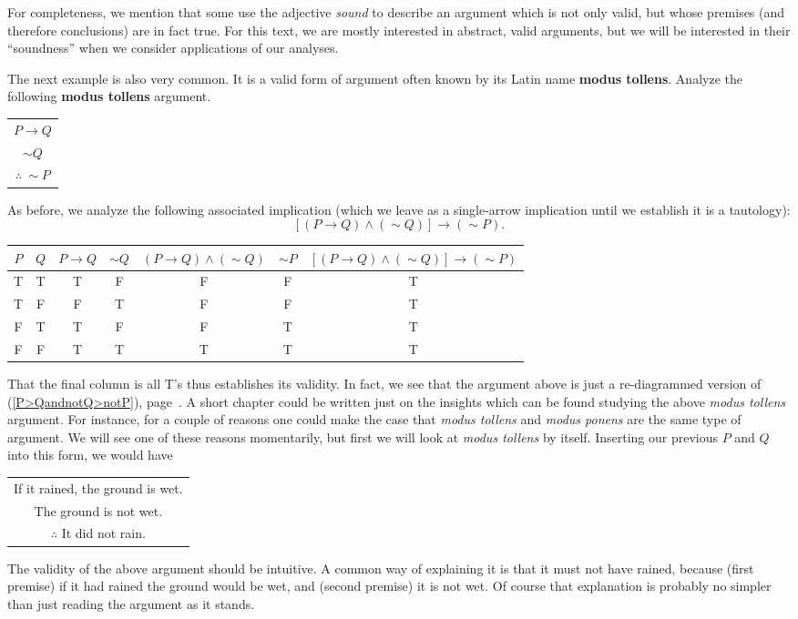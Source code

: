 For completeness, we mention that some use the adjective {\it sound}
to describe an argument which is not only valid, but whose
premises (and therefore conclusions) are in fact true.
For this text, we are mostly interested in abstract, valid arguments,
but we will be interested in their ``soundness'' when we
consider applications of our analyses.




The next example is also very common.  It is a valid form
of argument often known by its Latin name {\bf modus tollens}.
\bex Analyze the following {\bf modus tollens} argument.
\begin{center}
\begin{tabular}{c}
$P\longrightarrow Q$\\
$\sim Q$\\
\hline
$\therefore\ \sim P$
\end{tabular}
\end{center}
As before, we analyze the following associated implication 
(which we leave as a single-arrow implication until we establish
it is a tautology):
$$[(P\rightarrow Q)\wedge(\sim Q)]\longrightarrow(\sim P).$$
\begin{center}
{\rm
\begin{tabular}{|c|c||c|c|c|c|c|}
\hline
$P$&$Q$&$P\rightarrow Q$&$\sim Q$&$(P\rightarrow Q)\wedge(\sim Q)$
&$\sim P$&$[(P\rightarrow Q)\wedge(\sim Q)]\longrightarrow(\sim P)$
\\
\hline
T&T&T&F&F&F&T\\
T&F&F&T&F&F&T\\
F&T&T&F&F&T&T\\
F&F&T&T&T&T&T\\
\hline
\end{tabular}
}\end{center}
That the final column is all {\rm T}'s thus establishes its
validity.
In fact, we see that the argument above is just a re-diagrammed
version of (\ref{P>QandnotQ>notP}), page~\pageref{P>QandnotQ>notP}.
\label{ModusTollensExample}\eex
A short chapter could be written just on the insights
which can be found studying the above {\it modus tollens} argument.
For instance, 
for a couple of reasons one could make the case that
{\it modus tollens} and {\it modus ponens} are the same type
of argument.  We will see one of these reasons momentarily, but
first we will look at {\it modus tollens}
by itself.  Inserting our previous $P$ and $Q$ into this form,
we would have
\begin{center}
\begin{tabular}{c}
If it rained, the ground is wet.\\
The ground is not wet.\\
\hline
$\therefore$ It did not rain.
\end{tabular}
\end{center}
The validity of the above argument should be intuitive.
A common way of explaining it is that it must not have rained,
because (first premise) if it had rained the ground would be
wet, and (second premise) it is not wet.  Of course that explanation
is probably no simpler than just reading the argument as it stands.

